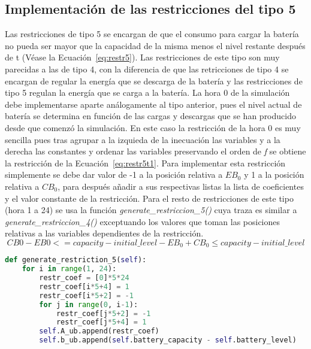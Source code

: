 \subsection{Implementación de las restricciones del tipo 5}
Las restricciones de tipo 5 se encargan de que el consumo para cargar la batería no pueda ser mayor que la capacidad de la misma menos el nivel restante después de t (Véase la Ecuación~\ref{eq:restr5}). Las restricciones de este tipo son muy parecidas a las de tipo 4, con la diferencia de que las retricciones de tipo 4 se encargan de regular la energía que se descarga de la batería y las restricciones de tipo 5 regulan la energía que se carga a la batería. La hora 0 de la simulación debe implementarse aparte análogamente al tipo anterior, pues el nivel actual de batería se determina en función de las cargas y descargas que se han producido desde que comenzó la simulación. En este caso la restricción de la hora 0 es muy sencilla pues tras agrupar a la izquieda de la inecuación las variables y a la derecha las constantes y ordenar las variables preservando el orden de \textit{f} se obtiene la restricción de la Ecuación~\ref{eq:restr5t1}. Para implementar esta restricción simplemente se debe dar valor de -1 a la posición relativa a $ EB_{0} $ y 1 a la posición relativa a $ CB_{0} $, para después añadir a sus respectivas listas la lista de coeficientes y el valor constante de la restricción. Para el resto de restricciones de este tipo (hora 1 a 24) se usa la función \textit{generate\_restriccion\_5()} cuya traza es similar a \textit{generate\_restriccion\_4()} exceptuando los valores que toman las posiciones relativas a las variables dependientes de la restricción.
\begin{equation}
  \label{eq:restr5t1}
  CB0 - EB0 <= capacity - initial\_level
  -EB_{0} + CB_{0} \leq capacity - initial\_level
\end{equation}
\begin{lstlisting}[language=Python,float=ht,caption={Restricciones del tipo 5},label={lst:restr5}]
def generate_restriction_5(self):
    for i in range(1, 24):
        restr_coef = [0]*5*24
        restr_coef[i*5+4] = 1
        restr_coef[i*5+2] = -1
        for j in range(0, i-1):
            restr_coef[j*5+2] = -1
            restr_coef[j*5+4] = 1
        self.A_ub.append(restr_coef)
        self.b_ub.append(self.battery_capacity - self.battery_level)
\end{lstlisting}
